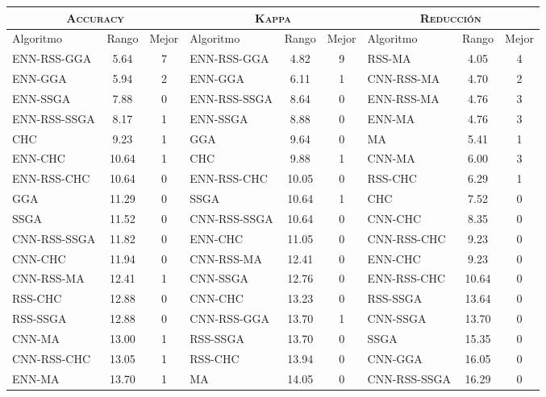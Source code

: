 \begin{table}[]
\centering
\begin{adjustbox}{max width =\textwidth}
\begin{tabular}{l c c|l c c|l c c}
\hline
\multicolumn{3}{c|}{\textsc{Accuracy}}
	& \multicolumn{3}{c|}{\textsc{Kappa}}
	& \multicolumn{3}{c}{\textsc{Reducción}} \\
\hline
Algoritmo & Rango & Mejor & Algoritmo & Rango & Mejor & Algoritmo & Rango & Mejor \\
\hline
\hline

ENN-RSS-GGA  & 5.64  & 7 & ENN-RSS-GGA  & 4.82  & 9 & RSS-MA       & 4.05  & 4 \\
ENN-GGA      & 5.94  & 2 & ENN-GGA      & 6.11  & 1 & CNN-RSS-MA   & 4.70  & 2 \\ 
ENN-SSGA     & 7.88  & 0 & ENN-RSS-SSGA & 8.64  & 0 & ENN-RSS-MA   & 4.76  & 3 \\
ENN-RSS-SSGA & 8.17  & 1 & ENN-SSGA     & 8.88  & 0 & ENN-MA       & 4.76  & 3 \\ 
CHC          & 9.23  & 1 & GGA          & 9.64  & 0 & MA           & 5.41  & 1 \\
ENN-CHC      & 10.64 & 1 & CHC          & 9.88  & 1 & CNN-MA       & 6.00  & 3 \\
ENN-RSS-CHC  & 10.64 & 0 & ENN-RSS-CHC  & 10.05 & 0 & RSS-CHC      & 6.29  & 1 \\
GGA          & 11.29 & 0 & SSGA         & 10.64 & 1 & CHC          & 7.52  & 0 \\
SSGA         & 11.52 & 0 & CNN-RSS-SSGA & 10.64 & 0 & CNN-CHC      & 8.35  & 0 \\
CNN-RSS-SSGA & 11.82 & 0 & ENN-CHC      & 11.05 & 0 & CNN-RSS-CHC  & 9.23  & 0 \\
CNN-CHC      & 11.94 & 0 & CNN-RSS-MA   & 12.41 & 0 & ENN-CHC      & 9.23  & 0 \\
CNN-RSS-MA   & 12.41 & 1 & CNN-SSGA     & 12.76 & 0 & ENN-RSS-CHC  & 10.64 & 0 \\
RSS-CHC      & 12.88 & 0 & CNN-CHC      & 13.23 & 0 & RSS-SSGA     & 13.64 & 0 \\
RSS-SSGA     & 12.88 & 0 & CNN-RSS-GGA  & 13.70 & 1 & CNN-SSGA     & 13.70 & 0 \\
CNN-MA       & 13.00 & 1 & RSS-SSGA     & 13.70 & 0 & SSGA         & 15.35 & 0 \\
CNN-RSS-CHC  & 13.05 & 1 & RSS-CHC      & 13.94 & 0 & CNN-GGA      & 16.05 & 0 \\
ENN-MA       & 13.70 & 1 & MA           & 14.05 & 0 & CNN-RSS-SSGA & 16.29 & 0 \\

\end{tabular}
\end{adjustbox}
\end{table}
